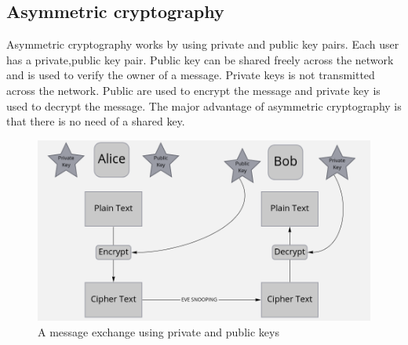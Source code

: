 \documentclass[12pt,a4paper]{report}
\begin{document}
\vspace{2cm}
\subsection{Asymmetric cryptography}
Asymmetric cryptography works by using private and public key pairs.
Each user has a private,public key pair. Public key can be shared freely across the network and is used to verify the owner of a message.
Private keys is not transmitted across the network. Public are used to encrypt the message and private key is used to decrypt the message. The major advantage of asymmetric cryptography is that there is no need of a shared key. \\

\begin{figure}[h!]
\begin{center}
\caption{A message exchange using private and public keys}
\includegraphics[scale=0.36]{asym}
\end{center}
\end{figure}

	
\end{document}
